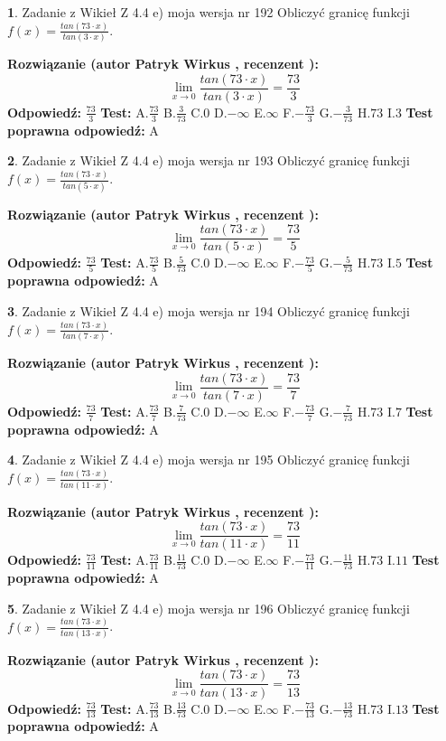 \documentclass[12pt, a4paper]{article}
\theoremstyle{definition} %
\newtheorem{zad}{}
\newcommand{\zadStart}[1]{\begin{zad}#1\newline}
\newcommand{\zadStop}{\end{zad}}
\newcommand{\rozwStart}[2]{\noindent \textbf{Rozwiązanie (autor #1 , recenzent #2): }\newline}
\newcommand{\rozwStop}{\newline}
\newcommand{\odpStart}{\noindent \textbf{Odpowiedź:}\newline}
\newcommand{\odpStop}{\newline}
\newcommand{\testStart}{\noindent \textbf{Test:}\newline}
\newcommand{\testStop}{\newline}
\newcommand{\kluczStart}{\noindent \textbf{Test poprawna odpowiedź:}\newline}
\newcommand{\kluczStop}{\newline}
\begin{document}
\zadStart{Zadanie z Wikieł Z 4.4 e) moja wersja nr 192}
Obliczyć granicę funkcji $f(x)=\frac{tan(73\cdot x)}{tan(3\cdot x)}$.
\zadStop
\rozwStart{Patryk Wirkus}{}
$$\lim\limits_{x\to 0}\frac{tan(73\cdot x)}{tan(3\cdot x)}=
\frac{73}{3}$$
\rozwStop
\odpStart
$\frac{73}{3}$
\odpStop
\testStart
A.$\frac{73}{3}$
B.$\frac{3}{73}$
C.$0$
D.$-\infty$
E.$\infty$
F.$-\frac{73}{3}$
G.$-\frac{3}{73}$
H.$73$
I.$3$
\testStop
\kluczStart
A
\kluczStop



\zadStart{Zadanie z Wikieł Z 4.4 e) moja wersja nr 193}
Obliczyć granicę funkcji $f(x)=\frac{tan(73\cdot x)}{tan(5\cdot x)}$.
\zadStop
\rozwStart{Patryk Wirkus}{}
$$\lim\limits_{x\to 0}\frac{tan(73\cdot x)}{tan(5\cdot x)}=
\frac{73}{5}$$
\rozwStop
\odpStart
$\frac{73}{5}$
\odpStop
\testStart
A.$\frac{73}{5}$
B.$\frac{5}{73}$
C.$0$
D.$-\infty$
E.$\infty$
F.$-\frac{73}{5}$
G.$-\frac{5}{73}$
H.$73$
I.$5$
\testStop
\kluczStart
A
\kluczStop



\zadStart{Zadanie z Wikieł Z 4.4 e) moja wersja nr 194}
Obliczyć granicę funkcji $f(x)=\frac{tan(73\cdot x)}{tan(7\cdot x)}$.
\zadStop
\rozwStart{Patryk Wirkus}{}
$$\lim\limits_{x\to 0}\frac{tan(73\cdot x)}{tan(7\cdot x)}=
\frac{73}{7}$$
\rozwStop
\odpStart
$\frac{73}{7}$
\odpStop
\testStart
A.$\frac{73}{7}$
B.$\frac{7}{73}$
C.$0$
D.$-\infty$
E.$\infty$
F.$-\frac{73}{7}$
G.$-\frac{7}{73}$
H.$73$
I.$7$
\testStop
\kluczStart
A
\kluczStop



\zadStart{Zadanie z Wikieł Z 4.4 e) moja wersja nr 195}
Obliczyć granicę funkcji $f(x)=\frac{tan(73\cdot x)}{tan(11\cdot x)}$.
\zadStop
\rozwStart{Patryk Wirkus}{}
$$\lim\limits_{x\to 0}\frac{tan(73\cdot x)}{tan(11\cdot x)}=
\frac{73}{11}$$
\rozwStop
\odpStart
$\frac{73}{11}$
\odpStop
\testStart
A.$\frac{73}{11}$
B.$\frac{11}{73}$
C.$0$
D.$-\infty$
E.$\infty$
F.$-\frac{73}{11}$
G.$-\frac{11}{73}$
H.$73$
I.$11$
\testStop
\kluczStart
A
\kluczStop



\zadStart{Zadanie z Wikieł Z 4.4 e) moja wersja nr 196}
Obliczyć granicę funkcji $f(x)=\frac{tan(73\cdot x)}{tan(13\cdot x)}$.
\zadStop
\rozwStart{Patryk Wirkus}{}
$$\lim\limits_{x\to 0}\frac{tan(73\cdot x)}{tan(13\cdot x)}=
\frac{73}{13}$$
\rozwStop
\odpStart
$\frac{73}{13}$
\odpStop
\testStart
A.$\frac{73}{13}$
B.$\frac{13}{73}$
C.$0$
D.$-\infty$
E.$\infty$
F.$-\frac{73}{13}$
G.$-\frac{13}{73}$
H.$73$
I.$13$
\testStop
\kluczStart
A
\kluczStop
\end{document}
